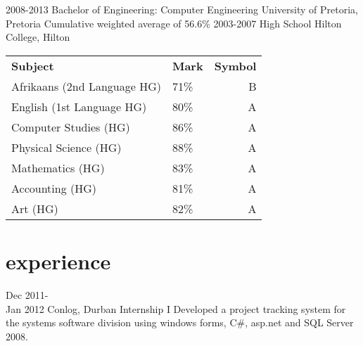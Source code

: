 \documentclass[a4paper]{friggeri-cv}
\begin{document}
\begin{entrylist}
  \entry
    {2008-2013}
    { Bachelor of Engineering: Computer Engineering}
    {University of Pretoria, Pretoria}
    {Cumulative weighted average of 56.6\%}
  \entry
    {2003-2007}
    { High School}
    {Hilton College, Hilton}
    { \begin{tabular}{p{5cm} p{1.5cm} r}
    		\textbf{Subject} & \textbf{Mark} & \textbf{Symbol}\\   		Afrikaans (2nd Language HG) & 71\% & B\\
    		English (1st Language HG) & 80\% & A\\
    		Computer Studies (HG) & 86\% & A\\
    		Physical Science (HG) & 88\% & A\\
    		Mathematics (HG) & 83\% & A\\
    		Accounting (HG) & 81\% & A\\
    		Art (HG) & 82\% & A\\
	\end{tabular}}
\end{entrylist}

\section{experience}

\begin{entrylist}
  \entry
    {Dec 2011-\\ Jan 2012}
    {Conlog, Durban}
    {Internship}
    {I Developed a project tracking system for the systems software division using windows forms, C\#, asp.net and SQL Server 2008.}
\end{entrylist}
\end{document}
